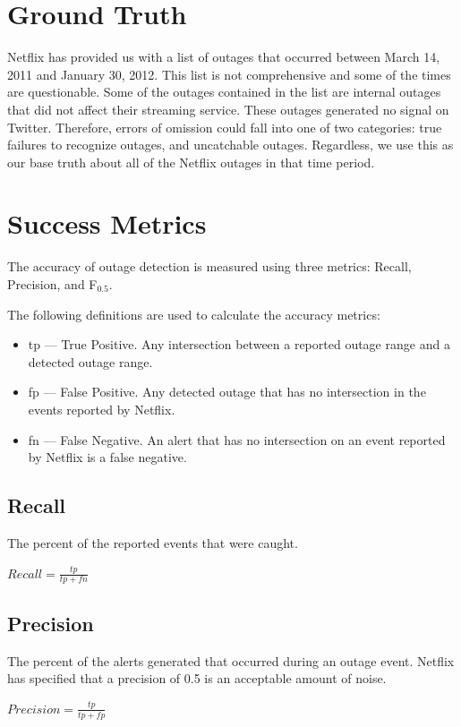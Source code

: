 \documentclass[12pt]{ucthesis}
\begin{document}
\section{Ground Truth}
\label{outage-detection-truth}
Netflix has provided us with a list of outages that occurred between March 14, 2011 and January 30, 2012.
This list is not comprehensive and some of the times are questionable. Some of the outages contained in the list
are internal outages that did not affect their streaming service. These outages generated no signal on Twitter.
Therefore, errors of omission could fall into one of two categories: true failures to recognize outages, and uncatchable
outages. Regardless, we use this as our base truth about all of the Netflix outages in that time period.

\section{Success Metrics}
\label{outage-detection-metrics}
The accuracy of outage detection is measured using three metrics: Recall, Precision, and F$_{0.5}$.

The following definitions are used to calculate the accuracy metrics:
\begin{itemize}
   \item tp --- True Positive. Any intersection between a reported outage range and a detected outage range.
   \item fp --- False Positive. Any detected outage that has no intersection in the events reported by Netflix.
   \item fn --- False Negative. An alert that has no intersection on an event reported by Netflix is a false negative.
\end{itemize}

\subsection{Recall}
The percent of the reported events that were caught.
\begin{center}
   $Recall = \frac{tp}{tp + fn}$
\end{center}

\subsection{Precision}
The percent of the alerts generated that occurred during an outage event.
Netflix has specified that a precision of 0.5 is an acceptable amount of noise.
\begin{center}
   $Precision = \frac{tp}{tp + fp}$
\end{center}
\end{document}
